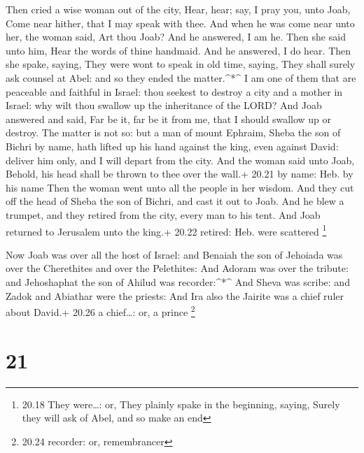  Then cried a wise woman out of the city, Hear, hear; say,
I pray you, unto Joab, Come near hither, that I may speak with thee.
 And when he was come near unto her, the woman said, Art
thou Joab? And he answered, I am he. Then she said unto him, Hear the
words of thine handmaid. And he answered, I do hear.  Then
she spake, saying, They were wont to speak in old time, saying, They
shall surely ask counsel at Abel: and so they ended the matter.\^{}*\^{}
 I am one of them that are peaceable and faithful in
Israel: thou seekest to destroy a city and a mother in Israel: why wilt
thou swallow up the inheritance of the LORD?  And Joab
answered and said, Far be it, far be it from me, that I should swallow
up or destroy.  The matter is not so: but a man of mount
Ephraim, Sheba the son of Bichri by name, hath lifted up his hand
against the king, even against David: deliver him only, and I will
depart from the city. And the woman said unto Joab, Behold, his head
shall be thrown to thee over the wall.+ 20.21 by name: Heb. by his name
 Then the woman went unto all the people in her wisdom. And
they cut off the head of Sheba the son of Bichri, and cast it out to
Joab. And he blew a trumpet, and they retired from the city, every man
to his tent. And Joab returned to Jerusalem unto the king.+ 20.22
retired: Heb. were scattered \footnote{20.18 They were\ldots: or, They
  plainly spake in the beginning, saying, Surely they will ask of Abel,
  and so make an end}

 Now Joab was over all the host of Israel: and Benaiah the
son of Jehoiada was over the Cherethites and over the Pelethites:
 And Adoram was over the tribute: and Jehoshaphat the son
of Ahilud was recorder:\^{}*\^{}  And Sheva was scribe: and
Zadok and Abiathar were the priests:  And Ira also the
Jairite was a chief ruler about David.+ 20.26 a chief\ldots: or, a
prince \footnote{20.24 recorder: or, remembrancer}

\hypertarget{section-20}{%
\section{21}\label{section-20}}

